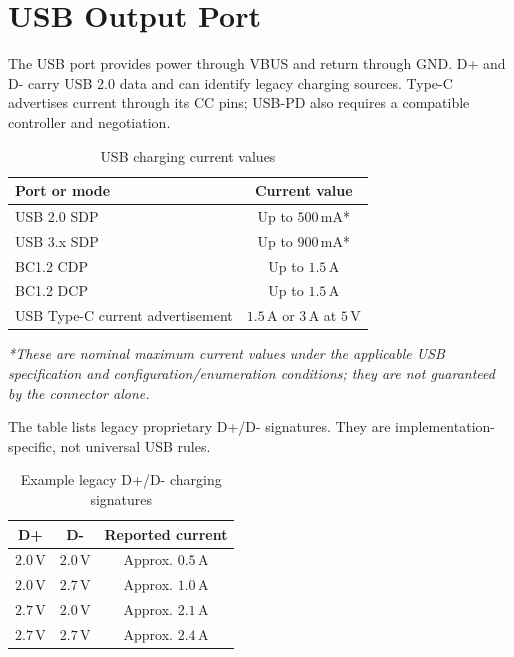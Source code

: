 \documentclass[journal,12pt,twocolumn]{IEEEtran}
\theoremstyle{definition}
\theoremstyle{remark}
\numberwithin{equation}{section}
\begin{document}
\FloatBarrier
\section{USB Output Port}
The USB port provides power through VBUS and return through GND.
D+ and D- carry USB 2.0 data and can identify legacy charging
sources. Type-C advertises current through its CC pins; USB-PD also
requires a compatible controller and negotiation.

\begin{table}[H]
\centering
\caption{USB charging current values}
\label{tab:usb-current-values}
\small
\begin{tabular}{|p{}|c|}
\hline
\textbf{Port or mode} & \textbf{Current value}\\ \hline
USB 2.0 SDP & Up to $500\,\mathrm{mA}$*\\
USB 3.x SDP & Up to $900\,\mathrm{mA}$*\\
BC1.2 CDP & Up to $1.5\,\mathrm{A}$\\
BC1.2 DCP & Up to $1.5\,\mathrm{A}$\\
USB Type-C current advertisement & $1.5\,\mathrm{A}$ or $3\,\mathrm{A}$ at $5\,\mathrm{V}$\\
\hline
\end{tabular}
\end{table}
\noindent\textit{*These are nominal maximum current values under the applicable USB specification and configuration/enumeration conditions; they are not guaranteed by the connector alone.}

The table lists legacy proprietary D+/D- signatures. They are
implementation-specific, not universal USB rules.

\begin{table}[H]
\centering
\caption{Example legacy D+/D- charging signatures}
\label{tab:legacy-usb-values}
\small
\begin{tabular}{|c|c|c|}
\hline
\textbf{D+} & \textbf{D-} & \textbf{Reported current}\\ \hline
$2.0\,\mathrm{V}$ & $2.0\,\mathrm{V}$ & Approx. $0.5\,\mathrm{A}$\\
$2.0\,\mathrm{V}$ & $2.7\,\mathrm{V}$ & Approx. $1.0\,\mathrm{A}$\\
$2.7\,\mathrm{V}$ & $2.0\,\mathrm{V}$ & Approx. $2.1\,\mathrm{A}$\\
$2.7\,\mathrm{V}$ & $2.7\,\mathrm{V}$ & Approx. $2.4\,\mathrm{A}$\\
\hline
\end{tabular}
\end{table}
\end{document}
